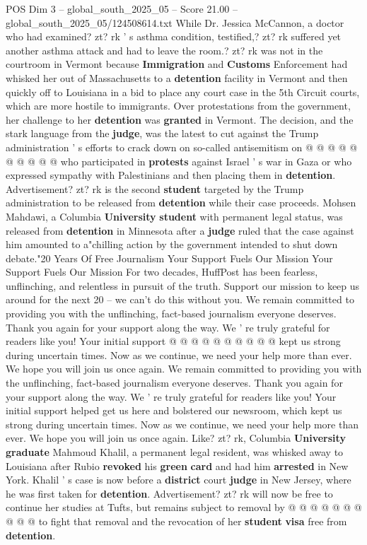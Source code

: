 \begin{textsample}{POS Dim 3 – global\_south\_2025\_05 – Score 21.00 – global\_south\_2025\_05/124508614.txt}
While Dr.
Jessica McCannon, a doctor who had examined? zt? rk ' s asthma condition, testified,? zt? rk suffered yet another asthma attack and had to leave the room.? zt? rk was not in the courtroom in Vermont because \textbf{Immigration} and \textbf{Customs} Enforcement had whisked her out of Massachusetts to a \textbf{detention} facility in Vermont and then quickly off to Louisiana in a bid to place any court case in the 5th Circuit courts, which are more hostile to immigrants.
Over protestations from the government, her challenge to her \textbf{detention} was \textbf{granted} in Vermont.
The decision, and the stark language from the \textbf{judge}, was the latest to cut against the Trump administration ' s efforts to crack down on so-called antisemitism on @ @ @ @ @ @ @ @ @ @ who participated in \textbf{protests} against Israel ' s war in Gaza or who expressed sympathy with Palestinians and then placing them in \textbf{detention}.
Advertisement? zt? rk is the second \textbf{student} targeted by the Trump administration to be released from \textbf{detention} while their case proceeds.
Mohsen Mahdawi, a Columbia \textbf{University} \textbf{student} with permanent legal status, was released from \textbf{detention} in Minnesota after a \textbf{judge} ruled that the case against him amounted to a"chilling action by the government intended to shut down debate."20 Years Of Free Journalism Your Support Fuels Our Mission Your Support Fuels Our Mission For two decades, HuffPost has been fearless, unflinching, and relentless in pursuit of the truth.
Support our mission to keep us around for the next 20 -- we can't do this without you.
We remain committed to providing you with the unflinching, fact-based journalism everyone deserves.
Thank you again for your support along the way.
We ' re truly grateful for readers like you!
Your initial support @ @ @ @ @ @ @ @ @ @ kept us strong during uncertain times.
Now as we continue, we need your help more than ever.
We hope you will join us once again.
We remain committed to providing you with the unflinching, fact-based journalism everyone deserves.
Thank you again for your support along the way.
We ' re truly grateful for readers like you!
Your initial support helped get us here and bolstered our newsroom, which kept us strong during uncertain times.
Now as we continue, we need your help more than ever.
We hope you will join us once again.
Like? zt? rk, Columbia \textbf{University} \textbf{graduate} Mahmoud Khalil, a permanent legal resident, was whisked away to Louisiana after Rubio \textbf{revoked} his \textbf{green} \textbf{card} and had him \textbf{arrested} in New York.
Khalil ' s case is now before a \textbf{district} court \textbf{judge} in New Jersey, where he was first taken for \textbf{detention}.
Advertisement? zt? rk will now be free to continue her studies at Tufts, but remains subject to removal by @ @ @ @ @ @ @ @ @ @ to fight that removal and the revocation of her \textbf{student} \textbf{visa} free from \textbf{detention}.

\end{textsample}
